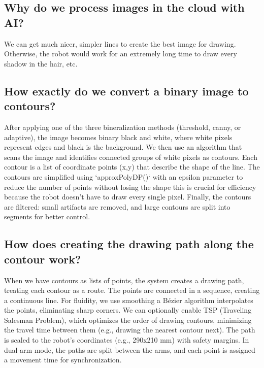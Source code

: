 \documentclass[a4paper,12pt]{article}
\begin{document}
\subsection{Why do we process images in the cloud with AI?}
We can get much nicer, simpler lines to create the best image for drawing. Otherwise, the robot would work for an extremely long time to draw every shadow in the hair, etc.

\subsection{How exactly do we convert a binary image to contours?}
After applying one of the three bineralization methods (threshold, canny, or adaptive), the image becomes binary black and white, where white pixels represent edges and black is the background. We then use an algorithm that scans the image and identifies connected groups of white pixels as contours. Each contour is a list of coordinate points (x,y) that describe the shape of the line. The contours are simplified using `approxPolyDP()` with an epsilon parameter to reduce the number of points without losing the shape this is crucial for efficiency because the robot doesn't have to draw every single pixel. Finally, the contours are filtered: small artifacts are removed, and large contours are split into segments for better control.

\subsection{How does creating the drawing path along the contour work?}
When we have contours as lists of points, the system creates a drawing path, treating each contour as a route. The points are connected in a sequence, creating a continuous line. For fluidity, we use smoothing a Bézier algorithm interpolates the points, eliminating sharp corners. We can optionally enable TSP (Traveling Salesman Problem), which optimizes the order of drawing contours, minimizing the travel time between them (e.g., drawing the nearest contour next). The path is scaled to the robot's coordinates (e.g., 290x210 mm) with safety margins. In dual-arm mode, the paths are split between the arms, and each point is assigned a movement time for synchronization.
\end{document}
